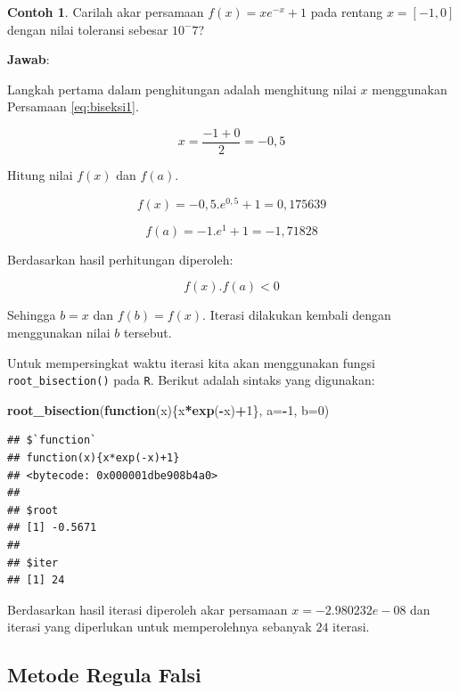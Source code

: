 \documentclass[
]{book}
\newenvironment{Shaded}{\begin{snugshade}}{\end{snugshade}}
\newcommand{\AttributeTok}[1]{\textcolor[rgb]{0.13,0.29,0.53}{#1}}
\newcommand{\ControlFlowTok}[1]{\textcolor[rgb]{0.13,0.29,0.53}{\textbf{#1}}}
\newcommand{\DecValTok}[1]{\textcolor[rgb]{0.00,0.00,0.81}{#1}}
\newcommand{\FunctionTok}[1]{\textcolor[rgb]{0.13,0.29,0.53}{\textbf{#1}}}
\newcommand{\NormalTok}[1]{#1}
\newcommand{\SpecialCharTok}[1]{\textcolor[rgb]{0.81,0.36,0.00}{\textbf{#1}}}
\theoremstyle{definition}
\theoremstyle{definition}
\newtheorem{example}{Contoh}[chapter]
\theoremstyle{definition}
\theoremstyle{definition}
\theoremstyle{remark}
\begin{document}
\begin{example}
\protect\hypertarget{exm:biseksexmp}{}\label{exm:biseksexmp}Carilah akar persamaan \(f\left(x \right)=xe^{-x}+1\) pada rentang \(x=\left[-1,0 \right]\) dengan nilai toleransi sebesar \(10^-7\)?
\end{example}

\textbf{Jawab}:

Langkah pertama dalam penghitungan adalah menghitung nilai \(x\) menggunakan Persamaan \eqref{eq:biseksi1}.

\[
x=\frac{-1+0}{2}=-0,5
\]

Hitung nilai \(f\left(x \right)\) dan \(f\left(a \right)\).

\[
f\left(x \right)=-0,5.e^{0,5}+1=0,175639
\]

\[
f\left(a \right)=-1.e^{1}+1=-1,71828
\]

Berdasarkan hasil perhitungan diperoleh:

\[
f\left(x \right).f\left(a \right)<0
\]

Sehingga \(b=x\) dan \(f\left(b \right)=f\left(x \right)\). Iterasi dilakukan kembali dengan menggunakan nilai \(b\) tersebut.

Untuk mempersingkat waktu iterasi kita akan menggunakan fungsi \texttt{root\_bisection()} pada \texttt{R}. Berikut adalah sintaks yang digunakan:

\begin{Shaded}
\begin{Highlighting}[]
\FunctionTok{root\_bisection}\NormalTok{(}\ControlFlowTok{function}\NormalTok{(x)\{x}\SpecialCharTok{*}\FunctionTok{exp}\NormalTok{(}\SpecialCharTok{{-}}\NormalTok{x)}\SpecialCharTok{+}\DecValTok{1}\NormalTok{\},}
               \AttributeTok{a=}\SpecialCharTok{{-}}\DecValTok{1}\NormalTok{, }\AttributeTok{b=}\DecValTok{0}\NormalTok{)}
\end{Highlighting}
\end{Shaded}

\begin{verbatim}
## $`function`
## function(x){x*exp(-x)+1}
## <bytecode: 0x000001dbe908b4a0>
## 
## $root
## [1] -0.5671
## 
## $iter
## [1] 24
\end{verbatim}

Berdasarkan hasil iterasi diperoleh akar persamaan \(x=-2.980232e-08\) dan iterasi yang diperlukan untuk memperolehnya sebanyak \(24\) iterasi.

\hypertarget{regulafalsi}{%
\subsection{Metode Regula Falsi}\label{regulafalsi}}
\end{document}
